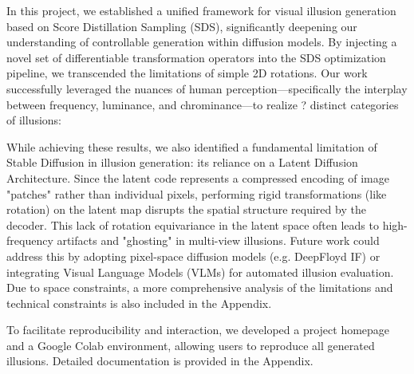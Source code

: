 \documentclass{article}
\begin{document}
In this project, we established a unified framework for visual illusion generation based on Score Distillation Sampling (SDS), significantly deepening our understanding of controllable generation within diffusion models. By injecting a novel set of differentiable transformation operators into the SDS optimization pipeline, we transcended the limitations of simple 2D rotations. Our work successfully leveraged the nuances of human perception—specifically the interplay between frequency, luminance, and chrominance—to realize ? distinct categories of illusions:

While achieving these results, we also identified a fundamental limitation of Stable Diffusion in illusion generation: its reliance on a Latent Diffusion Architecture. Since the latent code represents a compressed encoding of image "patches" rather than individual pixels, performing rigid transformations (like rotation) on the latent map disrupts the spatial structure required by the decoder. This lack of rotation equivariance in the latent space often leads to high-frequency artifacts and "ghosting" in multi-view illusions. Future work could address this by adopting pixel-space diffusion models (e.g. DeepFloyd IF) or integrating Visual Language Models (VLMs) for automated illusion evaluation. Due to space constraints, a more comprehensive analysis of the limitations and technical constraints is also included in the Appendix.

To facilitate reproducibility and interaction, we developed a project homepage and a Google Colab environment, allowing users to reproduce all generated illusions. Detailed documentation is provided in the Appendix.



\end{document}
